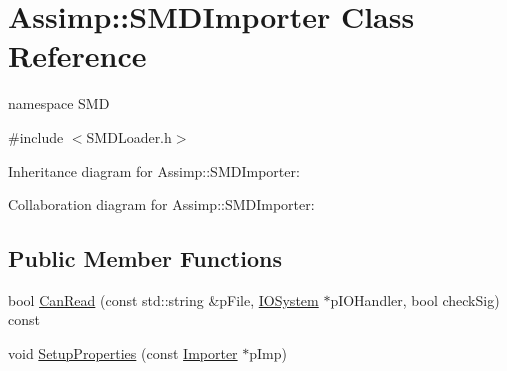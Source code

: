\hypertarget{class_assimp_1_1_s_m_d_importer}{\section{Assimp\+:\+:S\+M\+D\+Importer Class Reference}
\label{class_assimp_1_1_s_m_d_importer}
}


namespace S\+M\+D  




{\ttfamily \#include $<$S\+M\+D\+Loader.\+h$>$}



Inheritance diagram for Assimp\+:\+:S\+M\+D\+Importer\+:


Collaboration diagram for Assimp\+:\+:S\+M\+D\+Importer\+:
\subsection*{Public Member Functions}
\begin{DoxyCompactItemize}
\item 
bool \hyperlink{class_assimp_1_1_s_m_d_importer_a286b1d0e764a20f91382dee487daa5a5}{Can\+Read} (const std\+::string \&p\+File, \hyperlink{class_assimp_1_1_i_o_system}{I\+O\+System} $\ast$p\+I\+O\+Handler, bool check\+Sig) const 
\item 
void \hyperlink{class_assimp_1_1_s_m_d_importer_a816bd8aeb3f5c8b932be1fd0d7d68798}{Setup\+Properties} (const \hyperlink{class_assimp_1_1_importer}{Importer} $\ast$p\+Imp)
\end{DoxyCompactItemize}
